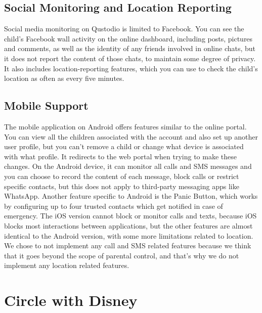\subsection{Social Monitoring and Location Reporting}

Social media monitoring on Qustodio is limited to Facebook. You can see the child's Facebook wall activity on the online dashboard, including posts, pictures and comments, as well as the identity of any friends involved in online chats, but it does not report the content of those chats, to maintain some degree of privacy. It also includes location-reporting features, which you can use to check the child's location as often as every five minutes.

\subsection{Mobile Support}

The mobile application on Android offers features similar to the online portal. You can view all the children associated with the account and also set up another user profile, but you can't remove a child or change what device is associated with what profile. It redirects to the web portal when trying to make these changes. On the Android device, it can monitor all calls and SMS messages and you can choose to record the content of each message, block calls or restrict specific contacts, but this does not apply to third-party messaging apps like WhatsApp. Another feature specific to Android is the Panic Button, which works by configuring up to four trusted contacts which get notified in case of emergency. The iOS version cannot block or monitor calls and texts, because iOS blocks most interactions between applications, but the other features are almost identical to the Android version, with some more limitations related to location.\parencite{qustodioPCMag} We chose to not implement any call and SMS related features because we think that it goes beyond the scope of parental control, and that's why we do not implement any location related features.

\section{Circle with Disney}

